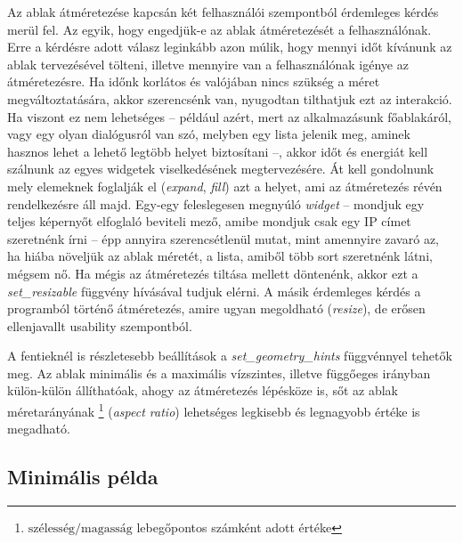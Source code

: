Az ablak átméretezése kapcsán két felhasználói szempontból érdemleges kérdés merül fel. Az egyik, hogy engedjük-e az ablak átméretezését a felhasználónak. Erre a kérdésre adott válasz leginkább azon múlik, hogy mennyi időt kívánunk az ablak tervezésével tölteni, illetve mennyire van a felhasználónak igénye az átméretezésre. Ha időnk korlátos és valójában nincs szükség a méret megváltoztatására, akkor szerencsénk van, nyugodtan tilthatjuk ezt az interakció. Ha viszont ez nem lehetséges -- például azért, mert az alkalmazásunk főablakáról, vagy egy olyan dialógusról van szó, melyben egy lista jelenik meg, aminek hasznos lehet a lehető legtöbb helyet biztosítani --, akkor időt és energiát kell szálnunk az egyes widgetek viselkedésének megtervezésére. Át kell gondolnunk mely elemeknek foglalják el (\textit{expand}, \textit{fill}) azt a helyet, ami az átméretezés révén rendelkezésre áll majd. Egy-egy feleslegesen megnyúló \textit{widget} -- mondjuk egy teljes képernyőt elfoglaló beviteli mező, amibe mondjuk csak egy IP címet szeretnénk írni -- épp annyira szerencsétlenül mutat, mint amennyire zavaró az, ha hiába növeljük az ablak méretét, a lista, amiből több sort szeretnénk látni, mégsem nő. Ha mégis az átméretezés tiltása mellett döntenénk, akkor ezt a \textit{set\_resizable} függvény hívásával tudjuk elérni. A másik érdemleges kérdés a programból történő átméretezés, amire ugyan megoldható (\textit{resize}), de erősen ellenjavallt usability szempontból.

A fentieknél is részletesebb beállítások a \textit{set\_geometry\_hints} függvénnyel tehetők meg. Az ablak minimális és a maximális vízszintes, illetve függőeges irányban külön-külön állíthatóak, ahogy az átméretezés lépésköze is, sőt az ablak méretarányának \footnote{$\mbox{szélesség} / \mbox{magasság}$ lebegőpontos számként adott értéke} (\textit{aspect ratio}) lehetséges legkisebb és legnagyobb értéke is megadható.

\subsection{Minimális példa}

